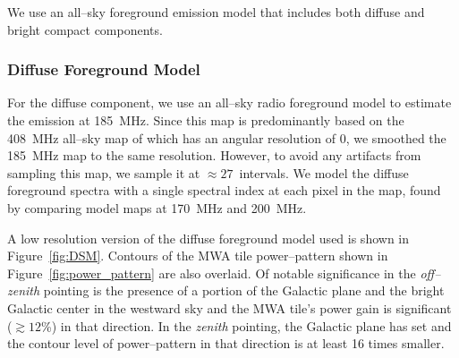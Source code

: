 \documentclass[preprint2,iop,numberedappendix]{emulateapj}
\begin{document}

We use an all--sky foreground emission model that includes both diffuse and bright compact components.  

\subsubsection{Diffuse Foreground Model}\label{sec:DSM}

For the diffuse component, we use an all--sky radio foreground model \citep{deo08} to estimate the emission at 185~MHz. Since this map is predominantly based on the 408~MHz all--sky map of \citet{has82} which has an angular resolution of 0, we smoothed the 185~MHz map to the same resolution. However, to avoid any artifacts from sampling this map, we sample it at $\approx 27$\arcmin~intervals. We model the diffuse foreground spectra with a single spectral index at each pixel in the map, found by comparing model maps at 170~MHz and 200~MHz.

A low resolution version of the diffuse foreground model used is shown in Figure~\ref{fig:DSM}. Contours of the MWA tile power--pattern shown in Figure~\ref{fig:power_pattern} are also overlaid. Of notable significance in the {\it off--zenith} pointing is the presence of a portion of the Galactic plane and the bright Galactic center in the westward sky and the MWA tile's power gain is significant ($\gtrsim 12$\%) in that direction. In the {\it zenith} pointing, the Galactic plane has set and the contour level of power--pattern in that direction is at least 16 times smaller. 
\end{document}
